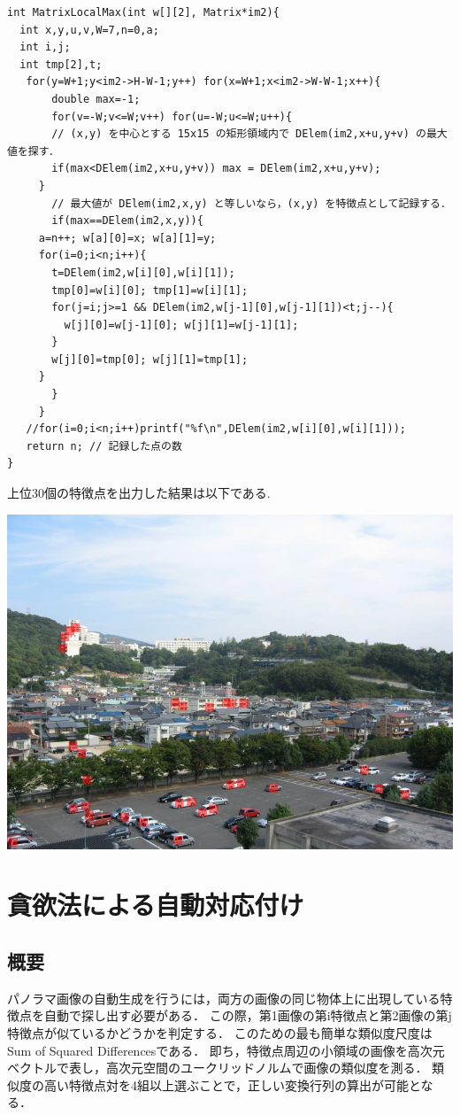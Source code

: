 \documentclass[a4j]{jarticle}
\begin{document}
\begin{verbatim}
int MatrixLocalMax(int w[][2], Matrix*im2){
  int x,y,u,v,W=7,n=0,a;
  int i,j;
  int tmp[2],t;
   for(y=W+1;y<im2->H-W-1;y++) for(x=W+1;x<im2->W-W-1;x++){
       double max=-1;
       for(v=-W;v<=W;v++) for(u=-W;u<=W;u++){
	   // (x,y) を中心とする 15x15 の矩形領域内で DElem(im2,x+u,y+v) の最大値を探す．
	   if(max<DElem(im2,x+u,y+v)) max = DElem(im2,x+u,y+v);
	 }
       // 最大値が DElem(im2,x,y) と等しいなら，(x,y) を特徴点として記録する．
       if(max==DElem(im2,x,y)){
	 a=n++; w[a][0]=x; w[a][1]=y;
	 for(i=0;i<n;i++){
	   t=DElem(im2,w[i][0],w[i][1]);
	   tmp[0]=w[i][0]; tmp[1]=w[i][1];
	   for(j=i;j>=1 && DElem(im2,w[j-1][0],w[j-1][1])<t;j--){
	     w[j][0]=w[j-1][0]; w[j][1]=w[j-1][1];
	   }
	   w[j][0]=tmp[0]; w[j][1]=tmp[1];
	 }
       }
     }
   //for(i=0;i<n;i++)printf("%f\n",DElem(im2,w[i][0],w[i][1]));
   return n; // 記録した点の数
}
\end{verbatim}
上位30個の特徴点を出力した結果は以下である. 
\begin{center}
\includegraphics[bb=0 0 768 576,scale=.35]{../5/out2.jpg}
\end{center}

\section{貪欲法による自動対応付け}

\subsection{概要}
パノラマ画像の自動生成を行うには，両方の画像の同じ物体上に出現している特徴点を自動で探し出す必要がある．
この際，第1画像の第i特徴点と第2画像の第j特徴点が似ているかどうかを判定する．
このための最も簡単な類似度尺度はSum of Squared Differencesである．
即ち，特徴点周辺の小領域の画像を高次元ベクトルで表し，高次元空間のユークリッドノルムで画像の類似度を測る．
類似度の高い特徴点対を4組以上選ぶことで，正しい変換行列の算出が可能となる．
\end{document}
